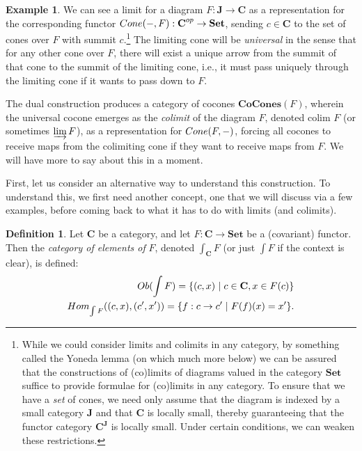 \documentclass[11pt]{book}
\theoremstyle{definition}
\newtheorem{example}{Example}[section]
\theoremstyle{definition}
\newtheorem{definition}{Definition}[section]
\theoremstyle{definition}
\theoremstyle{theorem}
\theoremstyle{definition}
\begin{document}
\begin{example}
	We can see a limit for a diagram $F: \textbf{J} \rightarrow \textbf{C}$ as a representation for the corresponding functor $Cone(\--, F): \textbf{C}^{op} \rightarrow \textbf{Set}$, sending $c \in \textbf{C}$ to the set of cones over $F$ with summit $c$.\footnote{While we could consider limits and colimits in any category, by something called the Yoneda lemma (on which much more below) we can be assured that the constructions of (co)limits of diagrams valued in the category $\textbf{Set}$ suffice to provide formulae for (co)limits in any category. To ensure that we have a \textit{set} of cones, we need only assume that the diagram is indexed by a small category $\textbf{J}$ and that $\textbf{C}$ is locally small, thereby guaranteeing that the functor category $\textbf{C}^{\textbf{J}}$ is locally small. Under certain conditions, we can weaken these restrictions.} The limiting cone will be \textit{universal} in the sense that for any other cone over $F$, there will exist a unique arrow from the summit of that cone to the summit of the limiting cone, i.e., it must pass uniquely through the limiting cone if it wants to pass down to $F$. 
	\par 
	The dual construction produces a category of cocones $\textbf{CoCones}(F)$, wherein the universal cocone emerges as the \textit{colimit} of the diagram $F$, denoted $\text{colim } F$ (or sometimes $\varinjlim F$), as a representation for $Cone(F, \--)$, forcing all cocones to receive maps from the colimiting cone if they want to receive maps from $F$. We will have more to say about this in a moment. \par 
	First, let us consider an alternative way to understand this construction. To understand this, we first need another concept, one that we will discuss via a few examples, before coming back to what it has to do with limits (and colimits). 
	\begin{definition}
		Let \textbf{C} be a category, and let $F: \textbf{C} \rightarrow \textbf{Set}$ be a (covariant) functor. Then the \textit{category of elements of} $F$, denoted $\int_{\textbf{C}} F$ (or just $\int F$ if the context is clear), is defined: 
	\begin{equation}
		\begin{split}
		Ob(\int F) = \{(c, x) \hspace*{0.3em}| \hspace*{0.3em} c \in \textbf{C}, x \in F(c) \} \\
		Hom_{\int F}((c,x), (c', x')) = \{f: c \rightarrow c' \hspace*{0.3em}| \hspace*{0.3em} F(f)(x) = x'\}.

\end{split}
\end{equation}
\end{definition}
\end{example}
\end{document}
